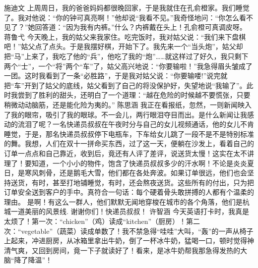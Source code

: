 {}\markdownRendererInterblockSeparator
{}施迪文\markdownRendererInterblockSeparator
{}上周周日，我的爸爸妈妈都很晚回家，于是我就住在孔俞橙家。我们睡觉了。我对他说：“你的钟可真亮啊！”他却说“我看不见。”我奇怪地问：“你怎么看不见了？”她回答道：“因为我有内裤。”什么？内裤戴在头上！孔俞橙可真调皮呀。\markdownRendererInterblockSeparator
{}\markdownRendererInterblockSeparator
{}蒋鲁弋\markdownRendererInterblockSeparator
{}今天晚上，我的姑父来我家住。吃完饭时，我对姑父说：“我们来下盘棋吧！”姑父点了点头。于是我摆好棋，开始下了。我先来一个“当头炮”，姑父却把“马”上来了，我吃了他的“兵”，他吃了我的“炮”……就这样过了好久，我只剩下两个“士”，一个“将”两个“车”了，姑父高兴地说：“你要输啦！”我急得眉头皱成了一团。这时我看到了一条“必胜路”，于是我对姑父说：“你要输喽!”说完就把“车”开到了姑父的底线，姑父看到了自己的将没保护好，失望地说“我输了”。此时我尝到了胜利的甜头，还明白了一个道理：“越在危险的时候越不要慌张，只要稍微动动脑筋，还是能化险为夷的。”\markdownRendererInterblockSeparator
{}\markdownRendererInterblockSeparator
{}陈思涵\markdownRendererInterblockSeparator
{}我正在看报纸，忽然，一则新闻映入了我的眼帘，吸引了我的眼球。不一会儿，两行眼泪夺目而出。是什么新闻让我感动的流泪了呢？一名快递员叔叔在午夜时分与自己的女儿视频通话，他的女儿不肯睡觉，于是，那名快递员叔叔停下电瓶车，下车给女儿跳了一段不是不是特别标准的舞。我想，人们在双十一拼命买东西，过了这一天，便躺在沙发上，看着自己的订单一点点和自己靠近，收到后，竟还有人评了差评，说送货太慢！这实在太不讲理了！要知道，一个小小的物件，饱含了快递员叔叔多少的汗水啊！不论是炎炎夏日，是寒风刺骨，还是鹅毛大雪，他们都在各处奔波。如果订单很远，他们也会坚持送货，有时，甚至打地铺睡觉，有时，还会熬夜送货。这些所有的付出，只为把订单安全送到客户的手中。真符合一句话：每个硬着骨头敢拼搏的人都有个温柔的理由。\markdownRendererInterblockSeparator
{}是啊！有这么一群人，他们默默无闻地穿梭在城市的各个角落，他们是杭城一道美丽的风景线.\markdownRendererInterblockSeparator
{}谢谢你们！快递员叔叔！\markdownRendererInterblockSeparator
{}\markdownRendererInterblockSeparator
{}许智涵\markdownRendererInterblockSeparator
{}今天英语打卡时，我真是太烦了！第一次：“chicken”（鸡）读成“kitchen”（厨房）！第二次：“vegetable”（蔬菜）读成单数了！我不禁急得“哇哇”大叫，“轰”的一声从椅子上起来，冲进厨房，从冰箱里拿出牛奶，倒了一杯冰牛奶，猛喝一口，顿时觉得神清气爽，又回到房间，竟一下子就读好了！看来，是冰牛奶帮我那急得发热的大脑“降了降温”！ \markdownRendererInterblockSeparator

